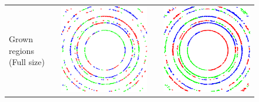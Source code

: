 \documentclass[preprint]{iucr}              %
\begin{document}
\begin{figure}
\begin{tabular}{>{\centering\arraybackslash}m{.1\linewidth}>{\centering\arraybackslash}m{.25\linewidth}>{\centering\arraybackslash}m{.25\linewidth}>{\centering\arraybackslash}m{.25\linewidth}}
Grown regions (Full size)&
\includegraphics[width=\linewidth]{Detail/o_max1_Regs_aftr_norSmooth.png}& &
\includegraphics[width=\linewidth]{Detail/o_max1_Regs_aftr_thin.png}
\end{tabular}


\end{figure}
\end{document}
